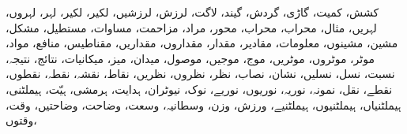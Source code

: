        کشش،            کمیت،            گاڑی،            گردش،            گیند،            لاگت،            لرزش،            لرزشیں،            لکیر،            لکیر،            لہر،            لہروں،            لہریں،            مثال،            محراب،            محراب،            محور،            مراد،            مزاحمت،            مساوات،            مستطیل،            مشکل،            مشین،            مشینوں،            معلومات،            مقادیر،            مقدار،            مقداروں،            مقداریں،            مقناطیس،            منافع،            مواد،            موٹر،            موٹروں،            موٹریں،            موج،            موجیں،            موصول،            میدان،            میز،            میکانیات،            نتائج،            نتیجہ،            نسبت،            نسل،            نسلیں،            نشان،            نصاب،            نظر،            نظروں،            نظریں،            نقاط،            نقشہ،            نقطہ،            نقطوں،            نقطے،            نقل،            نمونہ،            نوریہ،            نوریوں،            نوریے،            نوک،            نیوٹران،            ہدایت،            ہرمشی،            ہیّت،            ہیملٹنی،            ہیملٹنیاں،            ہیملٹنیوں،            ہیملٹنیے،            ورزش،            وزن،            وسطانیہ،            وسعت،            وضاحت،            وضاحتیں،            وقت،            وقتوں،            
